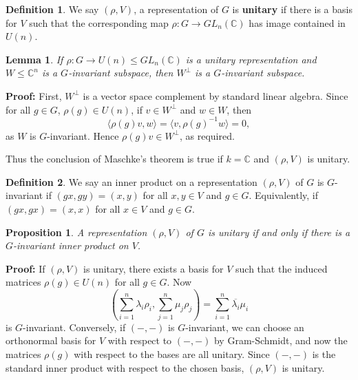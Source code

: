 \documentclass[12pt]{article}
\newtheorem{lemma}{Lemma}[section]
\newtheorem{proposition}{Proposition}[section]
\theoremstyle{definition}
\newtheorem{definition}{Definition}[section]
\theoremstyle{remark}
\begin{document}
\begin{definition}
	We say $(\rho, V)$, a representation of $G$ is \textbf{unitary} if there is a basis for $V$ such that the corresponding map $\rho : G \to GL_n(\mathbb{C})$ has image contained in $U(n)$.
\end{definition}

\begin{lemma}
	If $\rho : G \to U(n) \leq GL_n(\mathbb{C})$ is a unitary representation and $W \leq \mathbb{C}^{n}$ is a $G$-invariant subspace, then $W^{\perp}$ is a $G$-invariant subspace.
\end{lemma}

\begin{adjustbox}{minipage = \columnwidth - 25.5pt, margin=1em, frame=1pt, margin=0em}
	\textbf{Proof:} First, $W^{\perp}$ is a vector space complement by standard linear algebra. Since for all $g \in G$, $\rho(g) \in U(n)$, if $v \in W^{\perp}$ and $w \in W$, then
	\[
		\langle \rho(g)v, w \rangle = \langle v, \rho(g)^{-1} w \rangle = 0
	,\]
	as $W$ is $G$-invariant. Hence $\rho(g)v \in W^{\perp}$, as required.
\end{adjustbox}

Thus the conclusion of Maschke's theorem is true if $k = \mathbb{C}$ and $(\rho, V)$ is unitary.

\begin{definition}
	We say an inner product on a representation $(\rho, V)$ of $G$ is $G$-invariant if $(gx, gy) = (x, y)$ for all $x, y \in V$ and $g \in G$. Equivalently, if $(gx, gx) = (x, x)$ for all $x \in V$ and $g \in G$.
\end{definition}

\begin{proposition}
	A representation $(\rho, V)$ of $G$ is unitary if and only if there is a $G$-invariant inner product on $V$.
\end{proposition}

\begin{adjustbox}{minipage = \columnwidth - 25.5pt, margin=1em, frame=1pt, margin=0em}
	\textbf{Proof:} If $(\rho, V)$ is unitary, there exists a basis for $V$ such that the induced matrices $\rho(g) \in U(n)$ for all $g \in G$. Now
	\[
		\left( \sum_{i = 1}^{n} \lambda_i \rho_i, \sum_{j = 1}^{n} \mu_j \rho_j \right) = \sum_{i = 1}^{n} \overline{\lambda_i} \mu_i
	\]
	is $G$-invariant. Conversely, if $(-,-)$ is $G$-invariant, we can choose an orthonormal basis for $V$ with respect to $(-,-)$ by Gram-Schmidt, and now the matrices $\rho(g)$ with respect to the bases are all unitary. Since $(-,-)$ is the standard inner product with respect to the chosen basis, $(\rho, V)$ is unitary.
\end{adjustbox}
\end{document}
